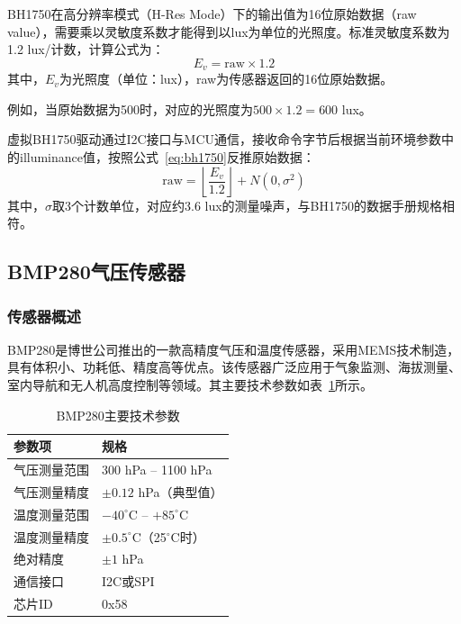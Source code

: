 \documentclass[12pt,a4paper]{ctexart}
\begin{document}
BH1750在高分辨率模式（H-Res Mode）下的输出值为16位原始数据（raw value），需要乘以灵敏度系数才能得到以lux为单位的光照度。标准灵敏度系数为1.2 lux/计数，计算公式为：
\begin{equation}
    E_v = \text{raw} \times 1.2
    \label{eq:bh1750}
\end{equation}
其中，$E_v$为光照度（单位：lux），raw为传感器返回的16位原始数据。

例如，当原始数据为500时，对应的光照度为$500 \times 1.2 = 600$ lux。

虚拟BH1750驱动通过I2C接口与MCU通信，接收命令字节后根据当前环境参数中的illuminance值，按照公式~\ref{eq:bh1750}反推原始数据：
\begin{equation}
    \text{raw} = \left\lfloor \frac{E_v}{1.2} \right\rfloor + N(0, \sigma^2)
\end{equation}
其中，$\sigma$取3个计数单位，对应约3.6 lux的测量噪声，与BH1750的数据手册规格相符。

\subsection{BMP280气压传感器}

\subsubsection{传感器概述}

BMP280是博世公司推出的一款高精度气压和温度传感器，采用MEMS技术制造，具有体积小、功耗低、精度高等优点。该传感器广泛应用于气象监测、海拔测量、室内导航和无人机高度控制等领域。其主要技术参数如表~\ref{tab:bmp280}所示。

\begin{table}[H]
    \centering
    \caption{BMP280主要技术参数}
    \label{tab:bmp280}
    \begin{tabular}{@{}ll@{}}
        \toprule
        \textbf{参数项} & \textbf{规格} \\
        \midrule
        气压测量范围 & 300 hPa -- 1100 hPa \\
        气压测量精度 & $\pm 0.12$ hPa（典型值） \\
        温度测量范围 & $-40^\circ$C -- $+85^\circ$C \\
        温度测量精度 & $\pm 0.5^\circ$C（25$^\circ$C时） \\
        绝对精度 & $\pm 1$ hPa \\
        通信接口 & I2C或SPI \\
        芯片ID & 0x58 \\
        \bottomrule
    \end{tabular}
\end{table}
\end{document}
